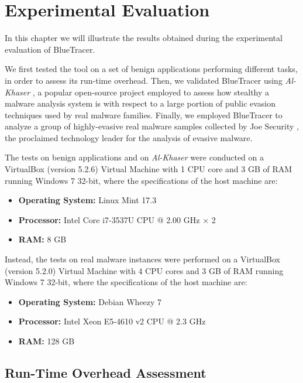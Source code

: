 
\chapter{Experimental Evaluation} \label{results}

In this chapter we will illustrate the results obtained during the experimental evaluation of BlueTracer.

We first tested the tool on a set of benign applications performing different tasks, in order to assess its run-time overhead. Then, we validated BlueTracer using \textit{Al-Khaser} \cite{AlK}, a popular open-source project employed to assess how stealthy a malware analysis system is with respect to a large portion of public evasion techniques used by real malware families. Finally, we employed BlueTracer to analyze a group of highly-evasive real malware samples collected by Joe Security \cite{JoeBox}, the proclaimed technology leader for the analysis of evasive malware.

\iffalse
If JoeBox added differentiate machines
\fi
The tests on benign applications and on \textit{Al-Khaser} were conducted on a VirtualBox (version 5.2.6)  Virtual Machine with 1 CPU core and 3 GB of RAM running Windows 7 32-bit, where the specifications of the host machine are:
\begin{itemize}
\item \textbf{Operating System:} Linux Mint 17.3 
\item \textbf{Processor:} Intel Core i7-3537U CPU @ 2.00 GHz $\times$ 2
\item \textbf{RAM:} 8 GB  
\end{itemize}

Instead, the tests on real malware instances were performed on a VirtualBox (version 5.2.0)  Virtual Machine with 4 CPU cores and 3 GB of RAM running Windows 7 32-bit, where the specifications of the host machine are:
\begin{itemize}
\item \textbf{Operating System:} Debian Wheezy 7 
\item \textbf{Processor:} Intel Xeon E5-4610 v2 CPU @ 2.3 GHz
\item \textbf{RAM:} 128 GB  
\end{itemize}
 

\section{Run-Time Overhead Assessment}

